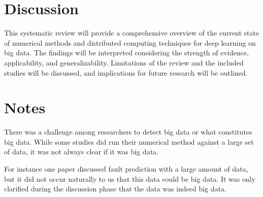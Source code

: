 \documentclass[a4paper,12pt]{article}
\begin{document}
\section{Discussion}
This systematic review will provide a comprehensive overview of the current state of numerical methods and distributed computing techniques for deep learning on big data. The findings will be interpreted considering the strength of evidence, applicability, and generalizability. Limitations of the review and the included studies will be discussed, and implications for future research will be outlined.


\section{Notes}

There was a challenge among researchers to detect big data or what constitutes big data. While some studies did run their numerical method against a large set of data, it was not always clear if it was big data. 

For instance one paper discussed fault prediction with a large amount of data, but it did not occur naturally to us that this data could be big data. It was only clarified during the discussion phase that the data was indeed big data.



\end{document}
